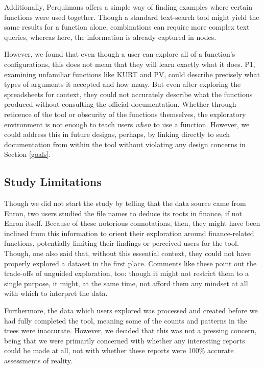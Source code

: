 \documentclass[conference]{IEEEtran}
\newcommand{\toolname}{Perquimans }
\begin{document}
	Additionally, \toolname offers a simple way of finding examples where certain
	functions were used together. Though a standard text-search tool might yield
	the same results for a function alone, combinations can require more complex
	text queries, whereas here, the information is already captured in nodes.  \par
	
	However, we found that even though a user can explore all of a function's
	configurations, this does not mean that they will learn exactly what it does.
	P1, examining unfamiliar functions like KURT and PV, could describe precisely
	what types of arguments it accepted and how many. But even after exploring the
	spreadsheets for context, they could not accurately describe what the functions
	produced without consulting the official documentation. Whether through
	reticence of the tool or obscurity of the functions themselves, the exploratory
	environment is not enough to teach users \textit{when} to use a function.
	However, we could address this in future designs, perhaps, by linking directly
	to such documentation from within the tool without violating any design
	concerns in Section \ref{goals}. \par
	
	\subsection{Study Limitations} Though we did not start the study by telling
	that the data source came from Enron, two users studied the file names to
	deduce its roots in finance, if not Enron itself. Because of these notorious
	connotations, then, they might have been inclined from this information to
	orient their exploration around finance-related functions, potentially limiting
	their findings or perceived users for the tool. Though, one also said that,
	without this essential context, they could not have properly explored a dataset
	in the first place. Comments like these point out the trade-offs of unguided
	exploration, too: though it might not restrict them to a single purpose, it
	might, at the same time, not afford them any mindset at all with which to
	interpret the data. \par
	
	Furthermore, the data which users explored was processed and created before we
	had fully completed the tool, meaning some of the counts and patterns in the
	trees were inaccurate. However, we decided that this was not a pressing
	concern, being that we were primarily concerned with whether any interesting
	reports could be made at all, not with whether these reports were 100\%
	accurate assessments of reality. \par
	
\end{document}
